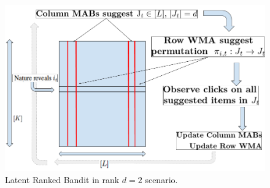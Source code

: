 \begin{figure}
    \includegraphics[scale=0.2]{img/RankedBand.png}
    \caption{Latent Ranked Bandit in rank $d=2$ scenario. }
    \label{fig:rankedbandit}
    \vspace*{-1em}
\end{figure}


